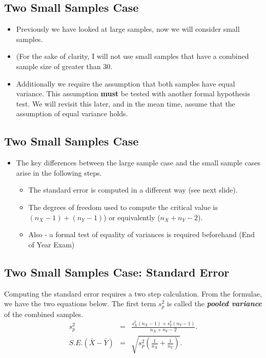 \documentclass[a4paper,12pt]{article}
\begin{document}


\subsection*{Two Small Samples Case}
\begin{itemize}
\item Previously we have looked at large samples, now we will consider small samples.
\item (For the sake of clarity, I will not use small samples that have a combined sample size of greater than 30.
\item Additionally we require the assumption that both samples have equal variance. This assumption \textbf{must} be tested with another formal hypothesis test. We will revisit this later, and in the mean time, assume that the assumption of equal variance holds.
\end{itemize}
\medskip


\subsection*{Two Small Samples Case}
\begin{itemize}
\item The key differences between the large sample case and the small sample cases arise in the following steps.
    \begin{itemize}
    \item The standard error is computed in a different way (see next slide).
    \item The degrees of freedom used to compute the critical value is $(n_X-1) + (n_Y - 1)$) or equivalently ($n_X + n_Y - 2$).
    \item Also - a formal test of equality of variances is required beforehand (End of Year Exam)
    \end{itemize}
\end{itemize}
\medskip

\subsection*{Two Small Samples Case: Standard Error}
Computing the standard error requires a two step calculation. From the formulae, we have the two equations below. The first term $s_p^2$ is called the \textbf{\textit{pooled variance}} of the combined samples.
\begin{eqnarray*}
s_p^2&=&\frac{s_X^2(n_X-1)+s_Y^2(n_Y-1)}{n_X+n_Y-2}.\\
S.E.(\bar{X}-\bar{Y})&=&\sqrt{s_p^2\left(\frac{1}{n_X}+\frac{1}{n_Y}\right)}.\\
\end{eqnarray*}
\medskip
\end{document}
